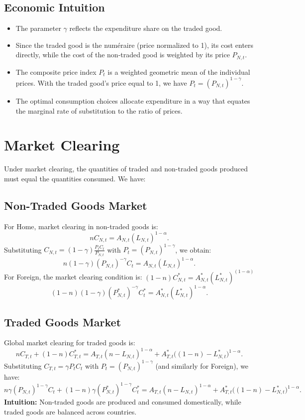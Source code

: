 \documentclass[a4paper,12pt]{article} %
\theoremstyle{nonitalic}
\begin{document}
\subsection*{Economic Intuition}
\begin{itemize}
    \item The parameter $\gamma$ reflects the expenditure share on the traded good.
    \item Since the traded good is the num\'eraire (price normalized to 1), its cost enters directly, while the cost of the non-traded good is weighted by its price $P_{N,t}$.
    \item The composite price index $P_t$ is a weighted geometric mean of the individual prices. With the traded good’s price equal to 1, we have $P_t = (P_{N,t})^{1-\gamma}$.
    \item The optimal consumption choices allocate expenditure in a way that equates the marginal rate of substitution to the ratio of prices.
\end{itemize}

\section{Market Clearing}
Under market clearing, the quantities of traded and non-traded goods produced must equal the quantities consumed. We have:
\subsection*{Non-Traded Goods Market}
For Home, market clearing in non-traded goods is:
\[
n C_{N,t} = A_{N,t} (L_{N,t})^{ 1-\alpha}.
\]
Substituting $ C_{N,t} = (1-\gamma)\frac{P_t C_t}{P_{N,t}}$ with $ P_t = (P_{N,t})^{1-\gamma} $, we obtain:
\[
\boxed{n(1-\gamma) (P_{N,t})^{-\gamma} C_t = A_{N,t} (L_{N,t})^{ 1-\alpha}.}
\]
For Foreign, the market clearing condition is: $(1-n)C_{N,t}^* = A_{N,t}^*(L_{N,t}^*)^{(1-\alpha)}$
\[
\boxed{(1-n)(1-\gamma) (P^*_{N,t})^{-\gamma} C^*_t = A^*_{N,t} (L^*_{N,t})^{ 1-\alpha}.}
\]

\subsection*{Traded Goods Market}
Global market clearing for traded goods is:
\[
n C_{T,t} + (1-n) C^*_{T,t} = A_{T,t} (n-L_{N,t})^{ 1-\alpha} + A^*_{T,t} \big((1-n)-L^*_{N,t}\big)^{ 1-\alpha}.
\]
Substituting $ C_{T,t}=\gamma P_t C_t $ with $ P_t=(P_{N,t})^{1-\gamma} $ (and similarly for Foreign), we have:
\[
\boxed{n\gamma (P_{N,t})^{1-\gamma} C_t + (1-n)\gamma (P^*_{N,t})^{1-\gamma} C^*_t = A_{T,t} (n-L_{N,t})^{ 1-\alpha} + A^*_{T,t} \big((1-n)-L^*_{N,t}\big)^{ 1-\alpha}.}
\]
\textbf{Intuition:} Non-traded goods are produced and consumed domestically, while traded goods are balanced across countries.
\end{document}
